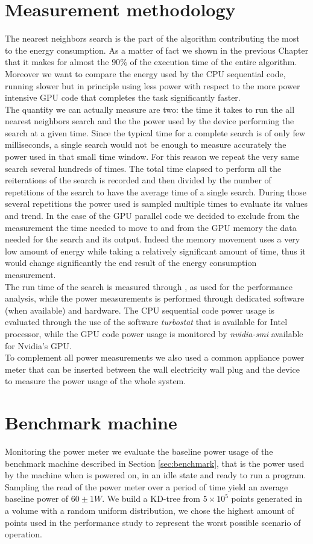 \section{Measurement methodology}
The nearest neighbors search is the part of the algorithm contributing the most to the energy consumption. As a matter of fact we shown in the previous Chapter that it makes for almost the $90\%$ of the execution time of the entire algorithm. Moreover we want to compare the energy used by the CPU sequential code, running slower but in principle using less power with respect to the more power intensive GPU code that completes the task significantly faster.\\ 
The quantity we can actually measure are two: the time it takes to run the all nearest neighbors search and the the power used by the device performing the search at a given time.
Since the typical time for a complete search is of only few milliseconds, a single search would not be enough to measure accurately the power used in that small time window. For this reason we repeat the very same search several hundreds of times. The total time elapsed to perform all the reiterations of the search is recorded and then divided by the number of repetitions of the search to have the average time of a single search. During those several repetitions the power used is sampled multiple times to evaluate its values and trend. In the case of the GPU parallel code we decided to exclude from the measurement the time needed to move to and from the GPU memory the data needed for the search and its output. Indeed the memory movement uses a very low amount of energy while taking a relatively significant amount of time, thus it would change significantly the end result of the energy consumption measurement.\\
The run time of the search is measured through , as used for the performance analysis, while the power measurements is performed through dedicated software (when available) and hardware. The CPU sequential code power usage is evaluated through the use of the software \textit{turbostat} that is available for Intel processor, while the GPU code power usage is monitored by \textit{nvidia-smi} available for Nvidia's GPU.\\
To complement all power measurements we also used a common appliance power meter that can be inserted between the wall electricity wall plug and the device to measure the power usage of the whole system.

\section{Benchmark machine}
Monitoring the power meter we evaluate the baseline power usage of the benchmark machine described in Section \ref{sec:benchmark}, that is the power used by the machine when is powered on, in an idle state and ready to run a program. Sampling the read of the power meter over a period of time yield an average baseline power of $60 \pm 1 \unit{W}$.
We build a KD-tree from $5 \times 10^5$ points generated in a volume with a random uniform distribution, we chose the highest amount of points used in the performance study to represent the worst possible scenario of operation.

